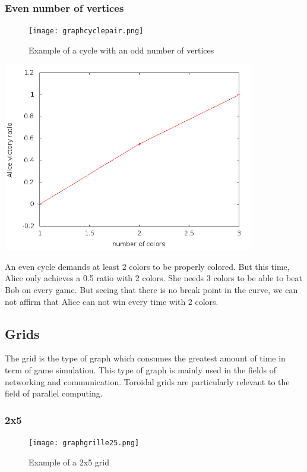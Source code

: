 \subsubsection{Even number of vertices}

\begin{figure}[h]
\begin{center}  
	\texttt{[image: graphcyclepair.png]}
\end{center}
    \caption{Example of a cycle with an odd number of vertices}
    \label{cyclepaire}
\end{figure}

\includegraphics[width=11cm]{resultats/cyclepair.png}

An even cycle demands at least 2 colors to be properly colored. But this time, Alice only achieves a 0.5 ratio with 2 colors. She needs 3 colors to be able to beat Bob on every game. But seeing that there is no break point in the curve, we can not affirm that Alice can not win every time with 2 colors.

\subsection{Grids}

The grid is the type of graph which consumes the greatest amount of time in term of game simulation. This type of graph is mainly used in the fields of networking and communication. Toroidal grids are particularly relevant to the field of parallel computing.

\subsubsection{2x5}

\begin{figure}[h]
\begin{center}  
	\texttt{[image: graphgrille25.png]}
\end{center}
    \caption{Example of a 2x5 grid}
    \label{grid25}
\end{figure}

